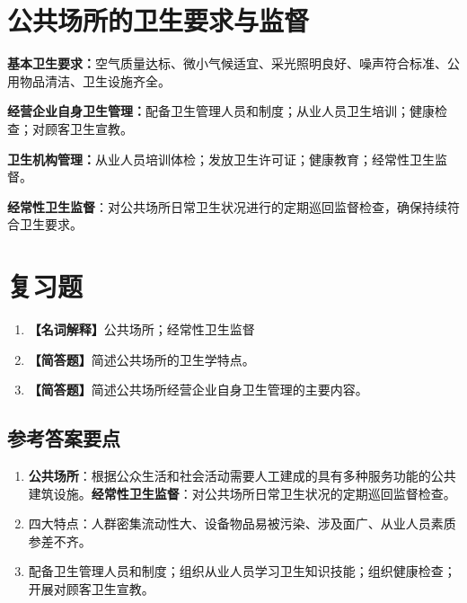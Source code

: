 \documentclass[10pt,a4paper,oneside]{ctexbook}
\begin{document}
\section{公共场所的卫生要求与监督}

\textbf{基本卫生要求：}空气质量达标、微小气候适宜、采光照明良好、噪声符合标准、公用物品清洁、卫生设施齐全。

\textbf{经营企业自身卫生管理：}配备卫生管理人员和制度；从业人员卫生培训；健康检查；对顾客卫生宣教。

\textbf{卫生机构管理：}从业人员培训体检；发放卫生许可证；健康教育；经常性卫生监督。

\begin{defbox}
\textbf{经常性卫生监督}：对公共场所日常卫生状况进行的定期巡回监督检查，确保持续符合卫生要求。
\end{defbox}

\section{复习题}

\begin{enumerate}[leftmargin=*, itemsep=8pt]
    \item \textbf{【名词解释】}公共场所；经常性卫生监督
    \item \textbf{【简答题】}简述公共场所的卫生学特点。
    \item \textbf{【简答题】}简述公共场所经营企业自身卫生管理的主要内容。
\end{enumerate}

\subsection*{参考答案要点}

\begin{enumerate}[leftmargin=*, itemsep=5pt]
    \item \textbf{公共场所}：根据公众生活和社会活动需要人工建成的具有多种服务功能的公共建筑设施。\textbf{经常性卫生监督}：对公共场所日常卫生状况的定期巡回监督检查。

    \item 四大特点：人群密集流动性大、设备物品易被污染、涉及面广、从业人员素质参差不齐。

    \item 配备卫生管理人员和制度；组织从业人员学习卫生知识技能；组织健康检查；开展对顾客卫生宣教。
\end{enumerate}

\newpage
\end{document}
